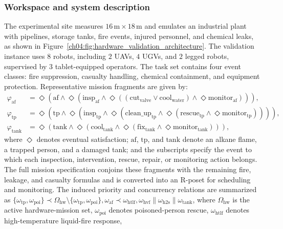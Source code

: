 \subsubsection{Workspace and system description}
The experimental site measures $16\,\mathrm{m} \times 18\,\mathrm{m}$ and
emulates an industrial plant with pipelines, storage tanks, fire events,
injured personnel, and chemical leaks, as shown in
Figure~\ref{ch04:fig:hardware_validation_architecture}.
The validation instance uses $8$
robots, including $2$ UAVs, $4$ UGVs, and $2$ legged robots, supervised
by $3$ tablet-equipped operators. The task set contains four event
classes: fire suppression, casualty handling, chemical containment, and
equipment protection. Representative mission fragments are given by:
\begin{align*}
\varphi_{\mathrm{af}}
&=\Diamond(\mathrm{af}\wedge
\Diamond(\mathrm{insp}_{\mathrm{af}}\wedge
\Diamond((\mathrm{cut}_{\mathrm{valve}}\vee
\mathrm{cool}_{\mathrm{water}})\wedge
\Diamond\mathrm{monitor}_{\mathrm{af}}))),\\
\varphi_{\mathrm{tp}}
&=\Diamond(\mathrm{tp}\wedge
\Diamond(\mathrm{insp}_{\mathrm{tp}}\wedge
\Diamond(\mathrm{clean\_up}_{\mathrm{tp}}\wedge
\Diamond(\mathrm{rescue}_{\mathrm{tp}}\wedge
\Diamond\mathrm{monitor}_{\mathrm{tp}})))),\\
\varphi_{\mathrm{tank}}
&=\Diamond(\mathrm{tank}\wedge
\Diamond(\mathrm{cool}_{\mathrm{tank}}\wedge
\Diamond(\mathrm{fix}_{\mathrm{tank}}\wedge
\Diamond\mathrm{monitor}_{\mathrm{tank}}))),
\end{align*}
where $\Diamond$ denotes eventual satisfaction; $\mathrm{af}$,
$\mathrm{tp}$, and $\mathrm{tank}$ denote an alkane flame, a trapped
person, and a damaged tank; and the subscripts specify the event to which
each inspection, intervention, rescue, repair, or monitoring action
belongs. The full mission specification conjoins these fragments with the
remaining fire, leakage, and casualty formulas and is converted into an
R-poset for scheduling and monitoring.
The induced priority and concurrency relations are summarized as
$\{\omega_{\mathrm{tp}},\omega_{\mathrm{poi}}\}
\prec \Omega_{\mathrm{hw}}\setminus
\{\omega_{\mathrm{tp}},\omega_{\mathrm{poi}}\},
\omega_{\mathrm{af}}\prec\omega_{\mathrm{htlf}},
\omega_{\mathrm{hvf}}\parallel\omega_{\mathrm{h2s}}\parallel
\omega_{\mathrm{tank}}$,
where $\Omega_{\mathrm{hw}}$ is the active hardware-mission set,
$\omega_{\mathrm{poi}}$ denotes poisoned-person rescue,
$\omega_{\mathrm{htlf}}$ denotes high-temperature liquid-fire response,
